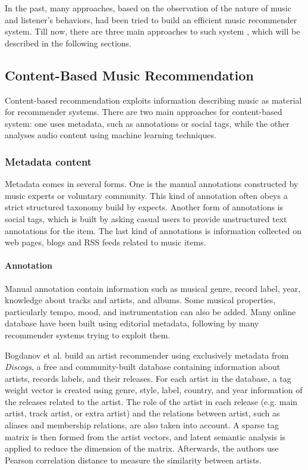 In the past, many approaches, based on the observation of the nature of music and listener's behaviors, had been tried to build an efficient music recommender system. Till now, there are three main approaches to such system \cite{ricci2011introduction}, which will be described in the following sections. 

\subsection{Content-Based Music Recommendation}

Content-based recommendation exploits information describing music as material for recommender systems. There are two main approaches for content-based system: one uses metadata, such as annotations or social tags, while the other analyses audio content using machine learning techniques.

\subsubsection{Metadata content}
Metadata comes in several forms. One is the manual annotations constructed by music experts or voluntary community. This kind of annotation often obeys a strict structured taxonomy build by expects. Another form of annotations is social tags, which is built by asking casual users to provide unstructured text annotations for the item. The last kind of annotations is information collected on web pages, blogs and RSS feeds related to music items.

\paragraph{Annotation} 
Manual annotation contain information such as musical genre, record label, year, knowledge about tracks and artists, and albums. Some musical properties, particularly tempo, mood, and instrumentation can also be added. Many online database have been built using editorial metadata, following by many recommender systems trying to exploit them. 

Bogdanov et al. \cite{bogdanov2012taking} build an artist recommender using exclusively metadata from \textit{Discogs}, a free and community-built database containing information about artists, records labels, and their releases. For each artist in the database, a tag weight vector is created using genre, style, label, country, and year information of the releases related to the artist. The role of the artist in each release (e.g. main artist, track artist, or extra artist) and the relations between artist, such as aliases and membership relations, are also taken into account. A sparse tag matrix is then formed from the artist vectors, and latent semantic analysis \cite{deerwester1990indexing} is applied to reduce the dimension of the matrix. Afterwards, the authors use Pearson correlation distance \cite{gibbons2011nonparametric} to measure the similarity between artists.

